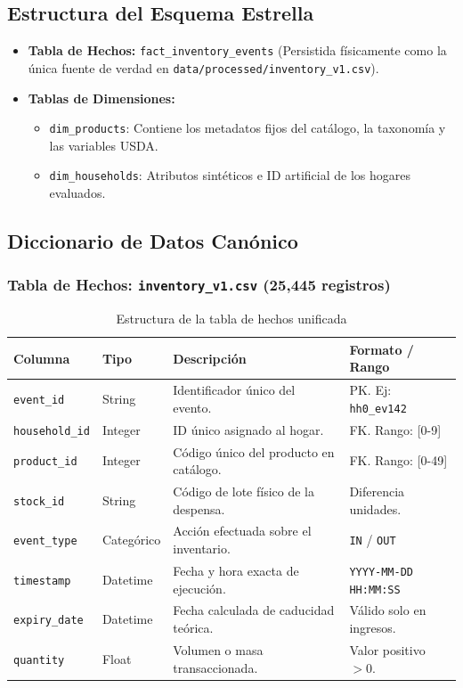 \documentclass[11pt,a4paper]{article}
\begin{document}
\subsection{Estructura del Esquema Estrella}
\begin{itemize}
    \item \textbf{Tabla de Hechos:} \texttt{fact\_inventory\_events} (Persistida físicamente como la única fuente de verdad en \texttt{data/processed/inventory\_v1.csv}).
    \item \textbf{Tablas de Dimensiones:} 
    \begin{itemize}
        \item \texttt{dim\_products}: Contiene los metadatos fijos del catálogo, la taxonomía y las variables USDA.
        \item \texttt{dim\_households}: Atributos sintéticos e ID artificial de los hogares evaluados.
    \end{itemize}
\end{itemize}

\subsection{Diccionario de Datos Canónico}

\subsubsection{Tabla de Hechos: \texttt{inventory\_v1.csv} (25,445 registros)}
\begin{table}[h!]
\centering
\small
\caption{Estructura de la tabla de hechos unificada}
\vspace{0.2cm}
\begin{tabular}{llll}
\toprule
\textbf{Columna} & \textbf{Tipo} & \textbf{Descripción} & \textbf{Formato / Rango} \\
\midrule
\texttt{event\_id} & String & Identificador único del evento. & PK. Ej: \texttt{hh0\_ev142} \\
\texttt{household\_id} & Integer & ID único asignado al hogar. & FK. Rango: [0-9] \\
\texttt{product\_id} & Integer & Código único del producto en catálogo. & FK. Rango: [0-49] \\
\texttt{stock\_id} & String & Código de lote físico de la despensa. & Diferencia unidades. \\
\texttt{event\_type} & Categórico & Acción efectuada sobre el inventario. & \texttt{IN} / \texttt{OUT} \\
\texttt{timestamp} & Datetime & Fecha y hora exacta de ejecución. & \texttt{YYYY-MM-DD HH:MM:SS} \\
\texttt{expiry\_date} & Datetime & Fecha calculada de caducidad teórica. & Válido solo en ingresos. \\
\texttt{quantity} & Float & Volumen o masa transaccionada. & Valor positivo $> 0$. \\
\bottomrule
\end{tabular}
\end{table}
\end{document}
